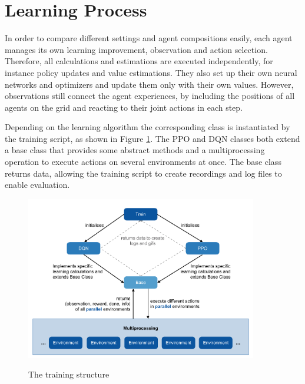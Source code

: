 \section{Learning Process}\label{learning_process}
In order to compare different settings and agent compositions easily, each agent manages its own learning improvement, observation and action selection. Therefore, all calculations and estimations are executed independently, for instance policy updates and value estimations. They also set up their own neural networks and optimizers and update them only with their own values. However, observations still connect the agent experiences, by including the positions of all agents on the grid and reacting to their joint actions in each step.

Depending on the learning algorithm the corresponding class is instantiated by the training script, as shown in Figure \ref{fig:training}. The PPO and DQN classes both extend a base class that provides some abstract methods and a multiprocessing operation to execute actions on several environments at once. The base class returns data, allowing the training script to create recordings and log files to enable evaluation.

\begin{figure}[hpbt]
    \centering
    \includegraphics[width=0.9\textwidth]{pictures/training}\\
    \caption[The Training Structure]{The training structure}\label{fig:training}
\end{figure}

